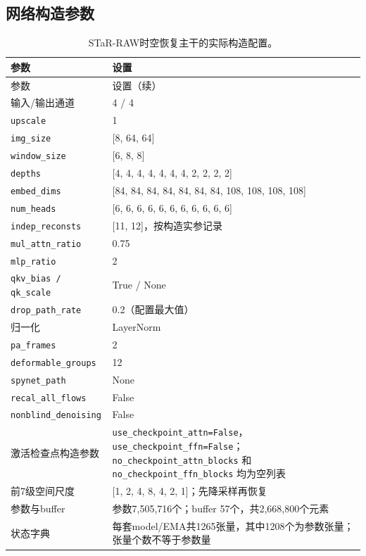 \documentclass[11pt,a4paper,UTF8,fontset=fandol]{ctexart}
\begin{document}
\subsection{网络构造参数}

\begin{longtable}{P{0.31\textwidth}P{0.61\textwidth}}
\caption{STaR-RAW时空恢复主干的实际构造配置。}\label{tab:model_config}\\
\toprule 参数 & 设置 \\ \midrule
\endfirsthead
\toprule 参数 & 设置（续） \\ \midrule
\endhead
\bottomrule\endfoot
输入/输出通道 & 4 / 4 \\
\texttt{upscale} & 1 \\
\texttt{img\_size} & [8, 64, 64] \\
\texttt{window\_size} & [6, 8, 8] \\
\texttt{depths} & [4, 4, 4, 4, 4, 4, 4, 2, 2, 2, 2] \\
\texttt{embed\_dims} & [84, 84, 84, 84, 84, 84, 84, 108, 108, 108, 108] \\
\texttt{num\_heads} & [6, 6, 6, 6, 6, 6, 6, 6, 6, 6, 6] \\
\texttt{indep\_reconsts} & [11, 12]，按构造实参记录 \\
\texttt{mul\_attn\_ratio} & 0.75 \\
\texttt{mlp\_ratio} & 2 \\
\texttt{qkv\_bias / qk\_scale} & True / None \\
\texttt{drop\_path\_rate} & 0.2（配置最大值） \\
归一化 & LayerNorm \\
\texttt{pa\_frames} & 2 \\
\texttt{deformable\_groups} & 12 \\
\texttt{spynet\_path} & None \\
\texttt{recal\_all\_flows} & False \\
\texttt{nonblind\_denoising} & False \\
激活检查点构造参数 & \texttt{use\_checkpoint\_attn=False}，\texttt{use\_checkpoint\_ffn=False}；\texttt{no\_checkpoint\_attn\_blocks} 和 \texttt{no\_checkpoint\_ffn\_blocks} 均为空列表 \\
前7级空间尺度 & [1, 2, 4, 8, 4, 2, 1]；先降采样再恢复 \\
参数与buffer & 参数7,505,716个；buffer 57个，共2,668,800个元素 \\
状态字典 & 每套model/EMA共1265张量，其中1208个为参数张量；张量个数不等于参数量 \\
\end{longtable}
\end{document}
